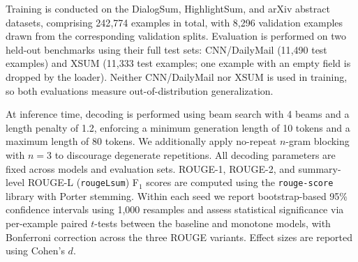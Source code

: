 \documentclass{article}
\theoremstyle{plain}
\theoremstyle{definition}
\theoremstyle{remark}
\begin{document}
Training is conducted on the DialogSum, HighlightSum, and arXiv abstract datasets, comprising 242{,}774 examples in total, with 8{,}296 validation examples drawn from the corresponding validation splits. %
Evaluation is performed on two held-out benchmarks using their full test sets: CNN/DailyMail (11{,}490 test examples) and XSUM (11{,}333 test examples; one example with an empty field is dropped by the loader).
Neither CNN/DailyMail nor XSUM is used in training, so both evaluations measure out-of-distribution generalization.

At inference time, decoding is performed using beam search with 4 beams and a length penalty of 1.2, enforcing a minimum generation length of 10 tokens and a maximum length of 80 tokens. We additionally apply no-repeat $n$-gram blocking with $n=3$ to discourage degenerate repetitions. All decoding parameters are fixed across models and evaluation sets. %
ROUGE-1, ROUGE-2, and summary-level ROUGE-L (\texttt{rougeLsum}) F$_1$ scores are computed using the \texttt{rouge-score} library with Porter stemming. Within each seed we report bootstrap-based 95\% confidence intervals using 1{,}000 resamples and assess statistical significance via per-example paired $t$-tests between the baseline and monotone models, with Bonferroni correction across the three ROUGE variants. Effect sizes are reported using Cohen's $d$.
\end{document}

